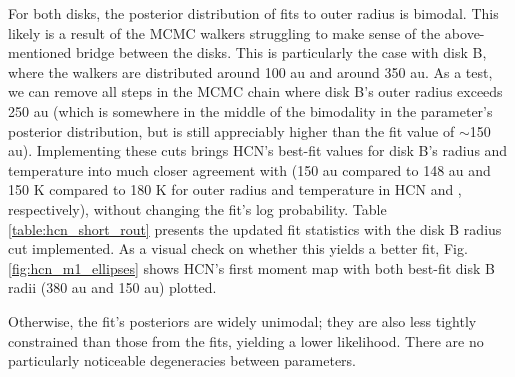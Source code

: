 For both disks, the posterior distribution of fits to outer radius is bimodal. This likely is a result of the MCMC walkers struggling to make sense of the above-mentioned bridge between the disks. This is particularly the case with disk B, where the walkers are distributed around 100 au and around 350 au. As a test, we can remove all steps in the MCMC chain where disk B's outer radius exceeds 250 au (which is somewhere in the middle of the bimodality in the parameter's posterior distribution, but is still appreciably higher than the \hco{} fit value of $\sim$150 au). Implementing these cuts brings HCN's best-fit values for disk B's radius and temperature into much closer agreement with \hco{} (150 au compared to 148 au and 150 K compared to 180 K for outer radius and temperature in HCN and \hco, respectively), without changing the fit's log probability. Table \ref{table:hcn_short_rout} presents the updated fit statistics with the disk B radius cut implemented. As a visual check on whether this yields a better fit, Fig. \ref{fig:hcn_m1_ellipses} shows HCN's first moment map with both best-fit disk B radii (380 au and 150 au) plotted.

Otherwise, the fit's posteriors are widely unimodal; they are also less tightly constrained than those from the \hco{} fits, yielding a lower likelihood. There are no particularly noticeable degeneracies between parameters.




